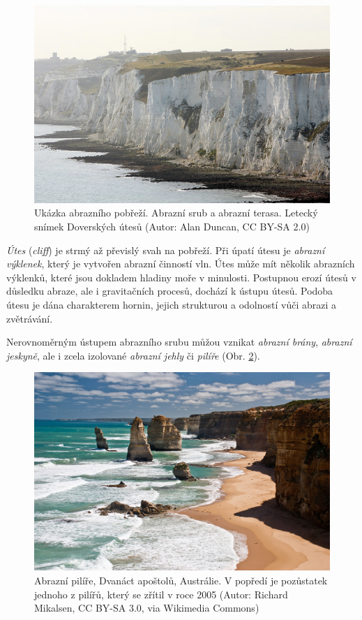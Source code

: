 \begin{figure}[h]
	\centering
	\includegraphics[width=1\linewidth]{obrazky/marine/abrazni}
	\caption{Ukázka abrazního pobřeží. Abrazní srub a abrazní terasa. Letecký snímek Doverských útesů (Autor: Alan Duncan, CC BY-SA 2.0)}
	\label{fig:abrazni}
\end{figure}

\emph{Útes} (\textit{cliff}) je strmý až převislý svah na pobřeží. Při úpatí útesu je \emph{abrazní výklenek}, který je vytvořen abrazní činností vln. Útes může mít několik abrazních výklenků, které jsou dokladem hladiny moře v minulosti. Postupnou erozí útesů v důsledku abraze, ale i gravitačních procesů, dochází k ústupu útesů. Podoba útesu je dána charakterem hornin, jejich strukturou a odolností vůči abrazi a zvětrávání. 

Nerovnoměrným ústupem abrazního srubu můžou vznikat \emph{abrazní brány}, \emph{abrazní jeskyně}, ale i zcela izolované \emph{abrazní jehly} či \emph{pilíře} (Obr. \ref{fig:apostol}).

\begin{figure}[h]
	\centering
	\includegraphics[width=1\linewidth]{obrazky/marine/apostolove}
	\caption{Abrazní pilíře, Dvanáct apoštolů, Austrálie. V popředí je pozůstatek jednoho z pilířů, který se zřítil v roce 2005 (Autor: Richard Mikalsen, CC BY-SA 3.0, via Wikimedia Commons)}
	\label{fig:apostol}
\end{figure}

